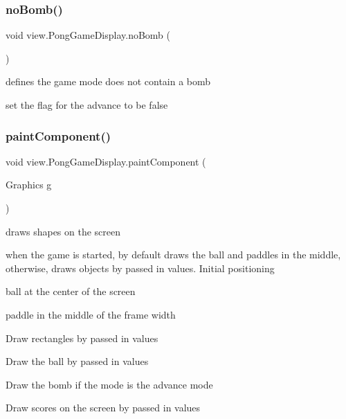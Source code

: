 \subsubsection{\texorpdfstring{no\+Bomb()}{noBomb()}}
{\footnotesize\ttfamily void view.\+Pong\+Game\+Display.\+no\+Bomb (\begin{DoxyParamCaption}{ }\end{DoxyParamCaption})}



defines the game mode does not contain a bomb 

set the flag for the advance to be false \hypertarget{classview_1_1_pong_game_display_a0e3a18dfc9bbd76c97439a618a3330ac}{}\label{classview_1_1_pong_game_display_a0e3a18dfc9bbd76c97439a618a3330ac} 
\subsubsection{\texorpdfstring{paint\+Component()}{paintComponent()}}
{\footnotesize\ttfamily void view.\+Pong\+Game\+Display.\+paint\+Component (\begin{DoxyParamCaption}\item[{Graphics}]{g }\end{DoxyParamCaption})\hspace{0.3cm}{\ttfamily [protected]}}



draws shapes on the screen 

when the game is started, by default draws the ball and paddles in the middle, otherwise, draws objects by passed in values. Initial positioning
\begin{DoxyItemize}
\item ball at the center of the screen
\item paddle in the middle of the frame width
\end{DoxyItemize}

Draw rectangles by passed in values

Draw the ball by passed in values

Draw the bomb if the mode is the advance mode

Draw scores on the screen by passed in values\hypertarget{classview_1_1_pong_game_display_a0fedbf41897932915b12f67542cb7695}{}\label{classview_1_1_pong_game_display_a0fedbf41897932915b12f67542cb7695} 
